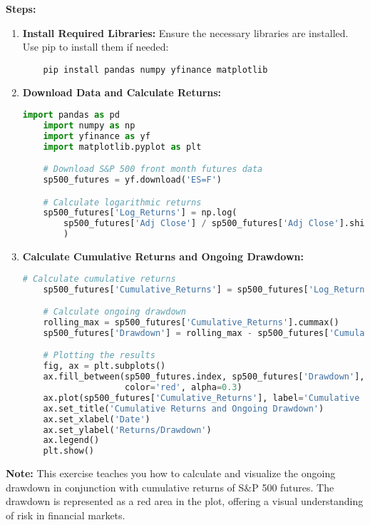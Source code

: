 \documentclass{article}
\begin{document}
\textbf{Steps:}
\begin{enumerate}
    \item \textbf{Install Required Libraries:} Ensure the necessary libraries are installed. Use pip to install them if needed:
    \begin{verbatim}
    pip install pandas numpy yfinance matplotlib
    \end{verbatim}

    \item \textbf{Download Data and Calculate Returns:}
    \begin{lstlisting}[language=Python]
    import pandas as pd
    import numpy as np
    import yfinance as yf
    import matplotlib.pyplot as plt

    # Download S&P 500 front month futures data
    sp500_futures = yf.download('ES=F')

    # Calculate logarithmic returns
    sp500_futures['Log_Returns'] = np.log(
        sp500_futures['Adj Close'] / sp500_futures['Adj Close'].shift(1)
        )
    \end{lstlisting}

    \item \textbf{Calculate Cumulative Returns and Ongoing Drawdown:}
    \begin{lstlisting}[language=Python]
    # Calculate cumulative returns
    sp500_futures['Cumulative_Returns'] = sp500_futures['Log_Returns'].cumsum()

    # Calculate ongoing drawdown
    rolling_max = sp500_futures['Cumulative_Returns'].cummax()
    sp500_futures['Drawdown'] = rolling_max - sp500_futures['Cumulative_Returns']

    # Plotting the results
    fig, ax = plt.subplots()
    ax.fill_between(sp500_futures.index, sp500_futures['Drawdown'], 
                    color='red', alpha=0.3)
    ax.plot(sp500_futures['Cumulative_Returns'], label='Cumulative Returns')
    ax.set_title('Cumulative Returns and Ongoing Drawdown')
    ax.set_xlabel('Date')
    ax.set_ylabel('Returns/Drawdown')
    ax.legend()
    plt.show()
    \end{lstlisting}
\end{enumerate}

\textbf{Note:} This exercise teaches you how to calculate and visualize the ongoing drawdown in conjunction with cumulative returns of S\&P 500 futures. The drawdown is represented as a red area in the plot, offering a visual understanding of risk in financial markets.
\end{document}
